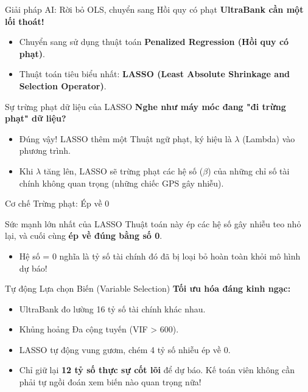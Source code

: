 \documentclass[aspectratio=169]{beamer}
\begin{document}
\begin{frame}{Giải pháp AI: Rời bỏ OLS, chuyển sang Hồi quy có phạt}
    \textbf{UltraBank cần một lối thoát!}
    \begin{itemize}
        \item Chuyển sang sử dụng thuật toán \textbf{Penalized Regression (Hồi quy có phạt)}.
        \item Thuật toán tiêu biểu nhất: \textbf{LASSO (Least Absolute Shrinkage and Selection Operator)}.
    \end{itemize}
\end{frame}

\begin{frame}{Sự trừng phạt dữ liệu của LASSO}
    \textbf{Nghe như máy móc đang "đi trừng phạt" dữ liệu?}
    \begin{itemize}
        \item Đúng vậy! LASSO thêm một Thuật ngữ phạt, ký hiệu là $\lambda$ (Lambda) vào phương trình.
        \item Khi $\lambda$ tăng lên, LASSO sẽ trừng phạt các hệ số ($\beta$) của những chỉ số tài chính không quan trọng (những chiếc GPS gây nhiễu).
    \end{itemize}
\end{frame}

\begin{frame}{Cơ chế Trừng phạt: Ép về 0}
    \begin{block}{Sức mạnh lớn nhất của LASSO}
        Thuật toán này ép các hệ số gây nhiễu teo nhỏ lại, và cuối cùng \textbf{ép về đúng bằng số 0}.
        \begin{itemize}
            \item Hệ số = 0 nghĩa là tỷ số tài chính đó đã bị loại bỏ hoàn toàn khỏi mô hình dự báo!
        \end{itemize}
    \end{block}
\end{frame}

\begin{frame}{Tự động Lựa chọn Biến (Variable Selection)}
    \textbf{Tối ưu hóa đáng kinh ngạc:}
    \begin{itemize}
        \item UltraBank đo lường 16 tỷ số tài chính khác nhau.
        \item Khủng hoảng Đa cộng tuyến (VIF > 600).
        \item LASSO tự động vung gươm, chém 4 tỷ số nhiễu ép về 0.
        \item Chỉ giữ lại \textbf{12 tỷ số thực sự cốt lõi} để dự báo. Kế toán viên không cần phải tự ngồi đoán xem biến nào quan trọng nữa!
    \end{itemize}
\end{frame}
\end{document}
